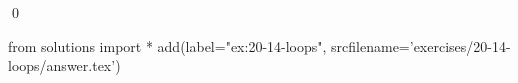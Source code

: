 
\begin{ex}
  \label{ex:20-14-loops}
  
  \qed
\end{ex}
\begin{python0}
from solutions import *
add(label="ex:20-14-loops",
    srcfilename='exercises/20-14-loops/answer.tex')
\end{python0}
